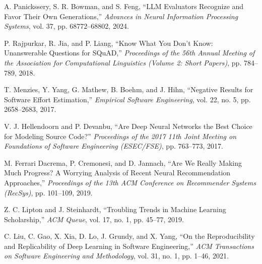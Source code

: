 A. Panickssery, S. R. Bowman, and S. Feng,
``LLM Evaluators Recognize and Favor Their Own Generations,''
\textit{Advances in Neural Information Processing Systems},
vol. 37, pp. 68772--68802, 2024.

P. Rajpurkar, R. Jia, and P. Liang,
``Know What You Don't Know: Unanswerable Questions for SQuAD,''
\textit{Proceedings of the 56th Annual Meeting of the Association for
Computational Linguistics (Volume 2: Short Papers)},
pp. 784--789, 2018.

T. Menzies, Y. Yang, G. Mathew, B. Boehm, and J. Hihn,
``Negative Results for Software Effort Estimation,''
\textit{Empirical Software Engineering},
vol. 22, no. 5, pp. 2658--2683, 2017.

V. J. Hellendoorn and P. Devanbu,
``Are Deep Neural Networks the Best Choice for Modeling Source Code?''
\textit{Proceedings of the 2017 11th Joint Meeting on Foundations of Software
Engineering (ESEC/FSE)},
pp. 763--773, 2017.

M. Ferrari Dacrema, P. Cremonesi, and D. Jannach,
``Are We Really Making Much Progress? A Worrying Analysis of Recent Neural
Recommendation Approaches,''
\textit{Proceedings of the 13th ACM Conference on Recommender Systems
(RecSys)},
pp. 101--109, 2019.

Z. C. Lipton and J. Steinhardt,
``Troubling Trends in Machine Learning Scholarship,''
\textit{ACM Queue},
vol. 17, no. 1, pp. 45--77, 2019.

C. Liu, C. Gao, X. Xia, D. Lo, J. Grundy, and X. Yang,
``On the Reproducibility and Replicability of Deep Learning in Software
Engineering,''
\textit{ACM Transactions on Software Engineering and Methodology},
vol. 31, no. 1, pp. 1--46, 2021.


